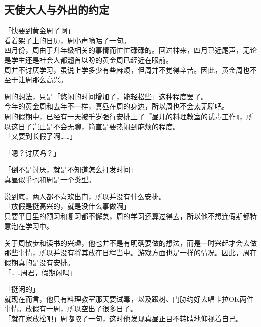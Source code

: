 \subsection{天使大人与外出的约定}

「快要到黄金周了啊」\\

看着架子上的日历，周小声嘀咕了一句。\\

四月份，周由于升年级相关的事情而忙忙碌碌的。回过神来，四月已近尾声，无论是学生还是社会人都翘首以盼的黄金周已经近在眼前。\\

周并不讨厌学习，虽说上学多少有些麻烦，但周并不觉得辛苦。因此，黄金周也不至于让周那么高兴。

周的想法，只是「悠闲的时间增加了，能轻松些」这种程度罢了。\\

今年的黄金周和去年不一样，真昼在周的身边，所以周也不会太无聊吧。\\

周的假期中，已经有一天被千岁强行安排上了『昼儿的料理教室的试毒工作』，所以这日子岂止是不会无聊，简直是要热闹到麻烦的程度。\\

「又要到长假了啊……」

「嗯？讨厌吗？」

「倒不是讨厌，就是不知道怎么打发时间」\\

真昼似乎也和周是一个类型。

说到底，两人都不喜欢出门，所以并没有什么安排。\\

「放假是挺高兴的，就是没什么事做啊」\\

只要平日里的预习和复习都不懈怠，周的学习还算过得去，所以他不想连假期都特意泡在学习中。

关于周散步和读书的兴趣，他也并不是有明确要做的想法，而是一时兴起才会去做那些事情，所以并没有将其放在日程当中。游戏方面也是一样的情况。因此，周在假期真的是没有安排。\\

「……周君，假期闲吗」

「挺闲的」\\

就现在而言，他只有料理教室那天要试毒，以及跟树、门胁约好去唱卡拉OK两件事情。放假有一周，所以空出了很多日子。\\

「就在家放松吧」周嘟哝了一句，这时他发现真昼正目不转睛地仰视着自己。\\


